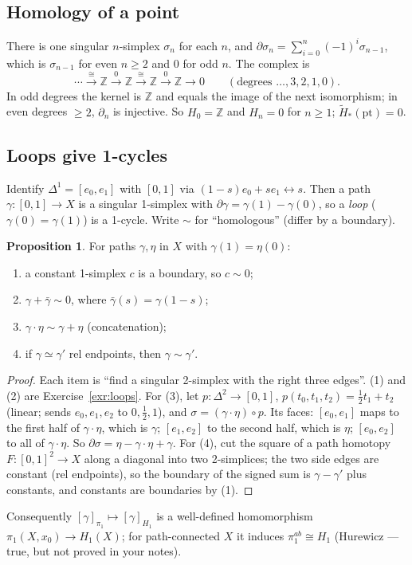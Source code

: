 \documentclass[11pt]{article}
\newcommand{\Z}{\mathbb Z}
\newcommand{\Hred}{\tilde H}
\theoremstyle{definition}
\newtheorem{prop}[thm]{Proposition}
\begin{document}
\subsection{Homology of a point}
There is one singular $n$-simplex $\sigma_n$ for each $n$, and $\partial\sigma_n=\sum_{i=0}^n(-1)^i\sigma_{n-1}$, which is $\sigma_{n-1}$ for even $n\ge2$ and $0$ for odd $n$. The complex is
\[\cdots\xrightarrow{\cong}\Z\xrightarrow{0}\Z\xrightarrow{\cong}\Z\xrightarrow{0}\Z\to0\qquad(\text{degrees }\dots,3,2,1,0).\]
In odd degrees the kernel is $\Z$ and equals the image of the next isomorphism; in even degrees $\ge2$, $\partial_n$ is injective. So $H_0=\Z$ and $H_n=0$ for $n\ge1$; $\Hred_*(\mathrm{pt})=0$.

\subsection{Loops give 1-cycles}\label{sec:loops}
Identify $\Delta^1=[e_0,e_1]$ with $[0,1]$ via $(1-s)e_0+se_1\leftrightarrow s$. Then a path $\gamma:[0,1]\to X$ is a singular 1-simplex with $\partial\gamma=\gamma(1)-\gamma(0)$, so a \emph{loop} ($\gamma(0)=\gamma(1)$) is a 1-cycle. Write $\sim$ for ``homologous'' (differ by a boundary).
\begin{prop}\label{prop:loops}
For paths $\gamma,\eta$ in $X$ with $\gamma(1)=\eta(0)$:
\begin{enumerate}
\item a constant 1-simplex $c$ is a boundary, so $c\sim0$;
\item $\gamma+\bar\gamma\sim0$, where $\bar\gamma(s)=\gamma(1-s)$;
\item $\gamma\cdot\eta\sim\gamma+\eta$ (concatenation);
\item if $\gamma\simeq\gamma'$ rel endpoints, then $\gamma\sim\gamma'$.
\end{enumerate}
\end{prop}
\begin{proof}
Each item is ``find a singular 2-simplex with the right three edges''. (1) and (2) are Exercise~\ref{exr:loops}. For (3), let $p:\Delta^2\to[0,1]$, $p(t_0,t_1,t_2)=\tfrac12t_1+t_2$ (linear; sends $e_0,e_1,e_2$ to $0,\tfrac12,1$), and $\sigma=(\gamma\cdot\eta)\circ p$. Its faces: $[e_0,e_1]$ maps to the first half of $\gamma\cdot\eta$, which is $\gamma$; $[e_1,e_2]$ to the second half, which is $\eta$; $[e_0,e_2]$ to all of $\gamma\cdot\eta$. So $\partial\sigma=\eta-\gamma\cdot\eta+\gamma$. For (4), cut the square of a path homotopy $F:[0,1]^2\to X$ along a diagonal into two 2-simplices; the two side edges are constant (rel endpoints), so the boundary of the signed sum is $\gamma-\gamma'$ plus constants, and constants are boundaries by (1).
\end{proof}
Consequently $[\gamma]_{\pi_1}\mapsto[\gamma]_{H_1}$ is a well-defined homomorphism $\pi_1(X,x_0)\to H_1(X)$; for path-connected $X$ it induces $\pi_1^{ab}\cong H_1$ (Hurewicz --- true, but not proved in your notes).
\end{document}
